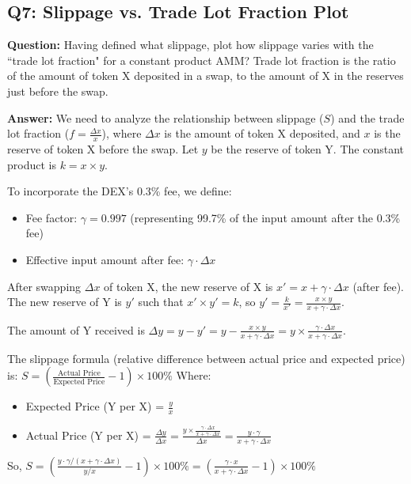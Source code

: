 \documentclass[12pt]{article}
\begin{document}
\subsection{Q7: Slippage vs. Trade Lot Fraction Plot}
\textbf{Question:} Having defined what slippage, plot how slippage varies with the ``trade lot fraction" for a constant product AMM? Trade lot fraction is the ratio of the amount of token X deposited in a swap, to the amount of X in the reserves just before the swap.

\textbf{Answer:} We need to analyze the relationship between slippage ($S$) and the trade lot fraction ($f = \frac{\Delta x}{x}$), where $\Delta x$ is the amount of token X deposited, and $x$ is the reserve of token X before the swap. Let $y$ be the reserve of token Y. The constant product is $k = x \times y$.

To incorporate the DEX's 0.3\% fee, we define:
\begin{itemize}
    \item Fee factor: $\gamma = 0.997$ (representing 99.7\% of the input amount after the 0.3\% fee)
    \item Effective input amount after fee: $\gamma \cdot \Delta x$
\end{itemize}

After swapping $\Delta x$ of token X, the new reserve of X is $x' = x + \gamma \cdot \Delta x$ (after fee). The new reserve of Y is $y'$ such that $x' \times y' = k$, so $y' = \frac{k}{x'} = \frac{x \times y}{x + \gamma \cdot \Delta x}$.

The amount of Y received is $\Delta y = y - y' = y - \frac{x \times y}{x + \gamma \cdot \Delta x} = y \times \frac{\gamma \cdot \Delta x}{x + \gamma \cdot \Delta x}$.

The slippage formula (relative difference between actual price and expected price) is:
$S = \left( \frac{\text{Actual Price}}{\text{Expected Price}} - 1 \right) \times 100\%$
Where:
\begin{itemize}
    \item Expected Price (Y per X) = $\frac{y}{x}$
    \item Actual Price (Y per X) = $\frac{\Delta y}{\Delta x} = \frac{y \times \frac{\gamma \cdot \Delta x}{x + \gamma \cdot \Delta x}}{\Delta x} = \frac{y \cdot \gamma}{x + \gamma \cdot \Delta x}$
\end{itemize}

So,
$S = \left( \frac{y \cdot \gamma / (x + \gamma \cdot \Delta x)}{y / x} - 1 \right) \times 100\% = \left( \frac{\gamma \cdot x}{x + \gamma \cdot \Delta x} - 1 \right) \times 100\%$
\end{document}
